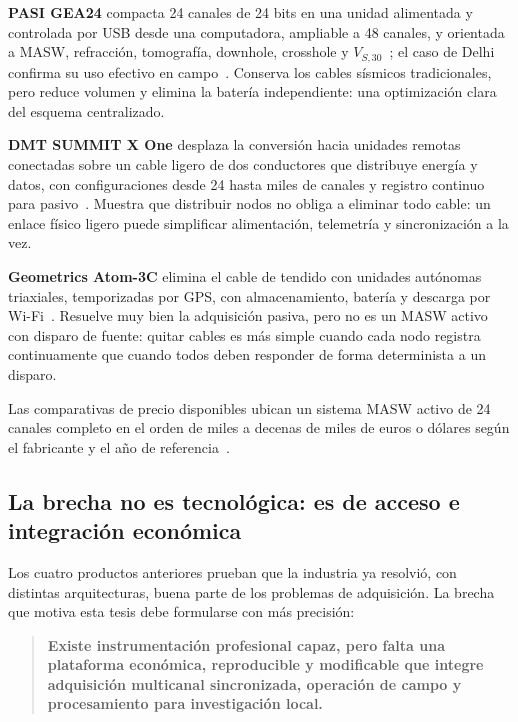 \textbf{PASI GEA24} compacta 24 canales de 24 bits en una unidad alimentada y controlada
por USB desde una computadora, ampliable a 48 canales, y orientada a MASW, refracción,
tomografía, downhole, crosshole y $V_{S,30}$~\cite{PASIGEA24}; el caso de Delhi confirma
su uso efectivo en campo~\cite{Gautam2020}. Conserva los cables sísmicos tradicionales,
pero reduce volumen y elimina la batería independiente: una optimización clara del
esquema centralizado.

\textbf{DMT SUMMIT X One} desplaza la conversión hacia unidades remotas conectadas sobre
un cable ligero de dos conductores que distribuye energía y datos, con configuraciones
desde 24 hasta miles de canales y registro continuo para pasivo~\cite{DMTSummitXOne}.
Muestra que distribuir nodos no obliga a eliminar todo cable: un enlace físico ligero
puede simplificar alimentación, telemetría y sincronización a la vez.

\textbf{Geometrics Atom-3C} elimina el cable de tendido con unidades autónomas
triaxiales, temporizadas por GPS, con almacenamiento, batería y descarga por
Wi-Fi~\cite{GeometricsAtom3C}. Resuelve muy bien la adquisición pasiva, pero no es un
MASW activo con disparo de fuente: quitar cables es más simple cuando cada nodo registra
continuamente que cuando todos deben responder de forma determinista a un disparo.

Las comparativas de precio disponibles ubican un sistema MASW activo de 24 canales
completo en el orden de miles a decenas de miles de euros o dólares según el fabricante y
el año de referencia~\cite{PASIPrice2022,GeometricsPrice2023,GeoDeviceSummitPrice}.

\subsection{La brecha no es tecnológica: es de acceso e integración económica}

Los cuatro productos anteriores prueban que la industria ya resolvió, con distintas
arquitecturas, buena parte de los problemas de adquisición. La brecha que motiva esta
tesis debe formularse con más precisión:

\begin{quote}
\textbf{Existe instrumentación profesional capaz, pero falta una plataforma económica,
reproducible y modificable que integre adquisición multicanal sincronizada, operación
de campo y procesamiento para investigación local.}
\end{quote}

